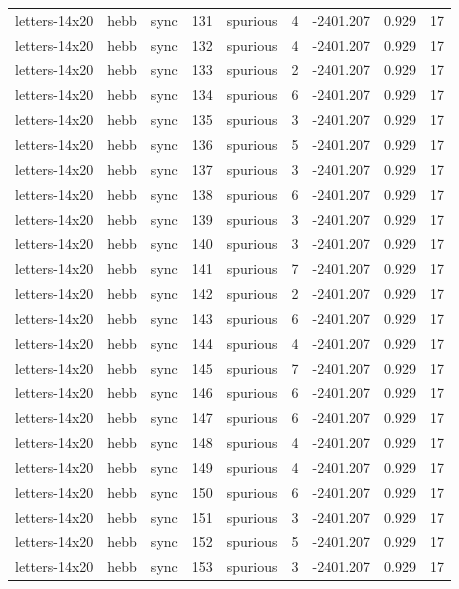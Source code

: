 \begin{tabular}{lllrlrrrr}
letters-14x20 & hebb & sync & 131 & spurious & 4 & -2401.207 & 0.929 & 17 \\
letters-14x20 & hebb & sync & 132 & spurious & 4 & -2401.207 & 0.929 & 17 \\
letters-14x20 & hebb & sync & 133 & spurious & 2 & -2401.207 & 0.929 & 17 \\
letters-14x20 & hebb & sync & 134 & spurious & 6 & -2401.207 & 0.929 & 17 \\
letters-14x20 & hebb & sync & 135 & spurious & 3 & -2401.207 & 0.929 & 17 \\
letters-14x20 & hebb & sync & 136 & spurious & 5 & -2401.207 & 0.929 & 17 \\
letters-14x20 & hebb & sync & 137 & spurious & 3 & -2401.207 & 0.929 & 17 \\
letters-14x20 & hebb & sync & 138 & spurious & 6 & -2401.207 & 0.929 & 17 \\
letters-14x20 & hebb & sync & 139 & spurious & 3 & -2401.207 & 0.929 & 17 \\
letters-14x20 & hebb & sync & 140 & spurious & 3 & -2401.207 & 0.929 & 17 \\
letters-14x20 & hebb & sync & 141 & spurious & 7 & -2401.207 & 0.929 & 17 \\
letters-14x20 & hebb & sync & 142 & spurious & 2 & -2401.207 & 0.929 & 17 \\
letters-14x20 & hebb & sync & 143 & spurious & 6 & -2401.207 & 0.929 & 17 \\
letters-14x20 & hebb & sync & 144 & spurious & 4 & -2401.207 & 0.929 & 17 \\
letters-14x20 & hebb & sync & 145 & spurious & 7 & -2401.207 & 0.929 & 17 \\
letters-14x20 & hebb & sync & 146 & spurious & 6 & -2401.207 & 0.929 & 17 \\
letters-14x20 & hebb & sync & 147 & spurious & 6 & -2401.207 & 0.929 & 17 \\
letters-14x20 & hebb & sync & 148 & spurious & 4 & -2401.207 & 0.929 & 17 \\
letters-14x20 & hebb & sync & 149 & spurious & 4 & -2401.207 & 0.929 & 17 \\
letters-14x20 & hebb & sync & 150 & spurious & 6 & -2401.207 & 0.929 & 17 \\
letters-14x20 & hebb & sync & 151 & spurious & 3 & -2401.207 & 0.929 & 17 \\
letters-14x20 & hebb & sync & 152 & spurious & 5 & -2401.207 & 0.929 & 17 \\
letters-14x20 & hebb & sync & 153 & spurious & 3 & -2401.207 & 0.929 & 17 \\

\end{tabular}
